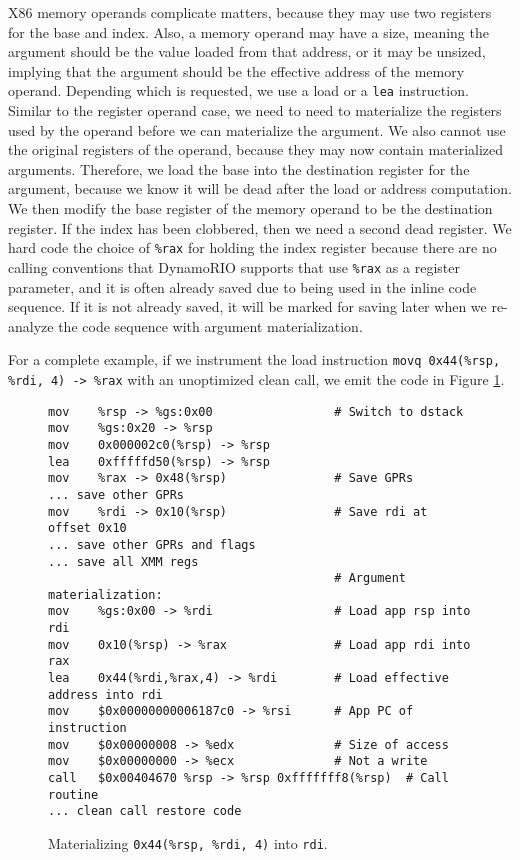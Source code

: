 X86 memory operands complicate matters, because they may use two registers for
the base and index.  Also, a memory operand may have a size, meaning the
argument should be the value loaded from that address, or it may be unsized,
implying that the argument should be the effective address of the memory
operand.  Depending which is requested, we use a load or a {\tt lea}
instruction.  Similar to the register operand case, we need to need to
materialize the registers used by the operand before we can materialize the
argument.  We also cannot use the original registers of the operand, because
they may now contain materialized arguments.  Therefore, we load the base into
the destination register for the argument, because we know it will be dead after
the load or address computation.  We then modify the base register of the memory
operand to be the destination register.  If the index has been clobbered, then
we need a second dead register.  We hard code the choice of {\tt \%rax} for
holding the index register because there are no calling conventions that
DynamoRIO supports that use {\tt \%rax} as a register parameter, and it is often
already saved due to being used in the inline code sequence.  If it is not
already saved, it will be marked for saving later when we re-analyze the code
sequence with argument materialization.

For a complete example, if we instrument the load instruction {\tt movq
0x44(\%rsp, \%rdi, 4) -> \%rax} with an unoptimized clean call, we emit the code
in Figure \ref{fig:arg_mat_lea}.

\begin{figure}
\begin{verbatim}
mov    %rsp -> %gs:0x00                 # Switch to dstack
mov    %gs:0x20 -> %rsp 
mov    0x000002c0(%rsp) -> %rsp 
lea    0xfffffd50(%rsp) -> %rsp 
mov    %rax -> 0x48(%rsp)               # Save GPRs
... save other GPRs
mov    %rdi -> 0x10(%rsp)               # Save rdi at offset 0x10
... save other GPRs and flags
... save all XMM regs
                                        # Argument materialization:
mov    %gs:0x00 -> %rdi                 # Load app rsp into rdi
mov    0x10(%rsp) -> %rax               # Load app rdi into rax
lea    0x44(%rdi,%rax,4) -> %rdi        # Load effective address into rdi
mov    $0x00000000006187c0 -> %rsi      # App PC of instruction
mov    $0x00000008 -> %edx              # Size of access
mov    $0x00000000 -> %ecx              # Not a write
call   $0x00404670 %rsp -> %rsp 0xfffffff8(%rsp)  # Call routine
... clean call restore code
\end{verbatim}
\caption{Materializing {\tt 0x44(\%rsp, \%rdi, 4)} into {\tt rdi}.}
\label{fig:arg_mat_lea}
\end{figure}

